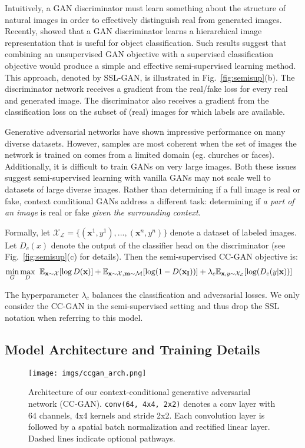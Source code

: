 \documentclass{article} %
\newcommand{\fig}[1]{Fig.~\ref{fig:#1}}
\begin{document}
Intuitively, a GAN discriminator must learn something about the structure of natural images in order to effectively distinguish real from generated images. 
Recently, \cite{radford2016} showed that a GAN discriminator learns a hierarchical image representation that is useful for object classification.  
Such results suggest that combining an unsupervised GAN objective with a supervised classification objective would produce a simple and effective semi-supervised learning method. 
This approach, denoted by SSL-GAN, is illustrated in \fig{semisup}(b). The discriminator network receives a gradient from the real/fake loss for every real and generated image.
The discriminator also receives a gradient from the classification loss on the subset of (real) images for which labels are available. 

Generative adversarial networks have shown impressive performance on many diverse datasets. However, samples are most coherent when the set of images the network is trained on comes from a limited domain (eg. churches or faces).
Additionally, it is difficult to train GANs on very large images.
Both these issues suggest semi-supervised learning with vanilla GANs may not scale well to datasets of large diverse images. 
Rather than determining if a full image is real or fake, context conditional GANs address a different task: determining if {\it a part of an image} is real or fake {\it given the surrounding context}.

Formally, let $\mathcal{X_L} = \{(\mathbf{x}^1, y^1), ..., (\mathbf{x}^n, y^n)\}$ denote a dataset of labeled images.
Let $D_c(x)$ denote the output of the classifier head on the discriminator (see \fig{semisup}(c) for details). 
Then the semi-supervised CC-GAN objective is: 
\begin{align}
\label{eqn:sslccgan}
\min_G \max_D \hspace{2mm} & \mathbb{E}_{\mathbf{x} \sim \mathcal{X}}[\log D(\mathbf{x})]  
+ \mathbb{E}_{\mathbf{x} \sim \mathcal{X}, \mathbf{m} \sim \mathcal{M}} [\log(1 - D(\mathbf{x_I}))]
+ \lambda_c  \mathbb{E}_{\mathbf{x},y \sim \mathcal{X_L}} [\log(D_c(y | \mathbf{x}))]
\end{align}

The hyperparameter $\lambda_c$ balances the classification and adversarial losses. 
We only consider the CC-GAN in the semi-supervised setting and thus drop the SSL notation when referring to this model. 

\subsection{Model Architecture and Training Details}\begin{figure}[t]
\centering
 \texttt{[image: imgs/ccgan\_arch.png]} 
\caption{ Architecture of our context-conditional generative adversarial network (CC-GAN). \texttt{conv(64, 4x4, 2x2)} denotes a conv layer with 64 channels, 4x4 kernels and stride 2x2. Each convolution layer is followed by a spatial batch normalization and rectified linear layer. Dashed lines indicate optional pathways.
}
\vspace{-0.7em}
\label{fig:network}
\end{figure}
\end{document}
